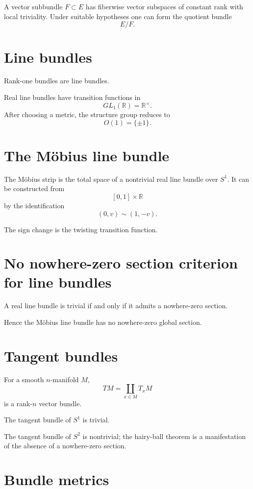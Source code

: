 A vector subbundle \(F\subset E\) has fiberwise vector subspaces of constant
rank with local triviality.  Under suitable hypotheses one can form the
quotient bundle
\[
E/F.
\]

\section{Line bundles}

Rank-one bundles are line bundles.

Real line bundles have transition functions in
\[
GL_1(\mathbb R)=\mathbb R^\times.
\]
After choosing a metric, the structure group reduces to
\[
O(1)=\{\pm1\}.
\]

\section{The Möbius line bundle}

The Möbius strip is the total space of a nontrivial real line bundle over
\(S^1\).  It can be constructed from
\[
[0,1]\times\mathbb R
\]
by the identification
\[
(0,v)\sim(1,-v).
\]

The sign change is the twisting transition function.

\section{No nowhere-zero section criterion for line bundles}

A real line bundle is trivial if and only if it admits a nowhere-zero section.

Hence the Möbius line bundle has no nowhere-zero global section.

\section{Tangent bundles}

For a smooth \(n\)-manifold \(M\),
\[
TM=\coprod_{x\in M}T_xM
\]
is a rank-\(n\) vector bundle.

The tangent bundle of \(S^1\) is trivial.

The tangent bundle of \(S^2\) is nontrivial; the hairy-ball theorem is a
manifestation of the absence of a nowhere-zero section.

\section{Bundle metrics}

